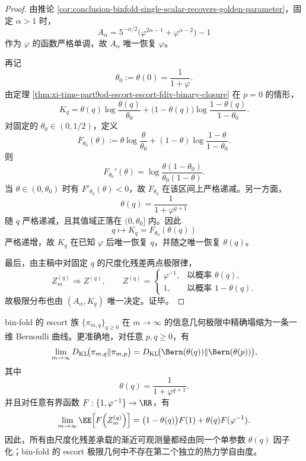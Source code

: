 \begin{proof}
由推论 \ref{cor:conclusion-binfold-single-scalar-recovers-golden-parameter}，固定 \(\alpha>1\) 时，
\[
A_\alpha
=
5^{-\alpha/2}\bigl(\varphi^{2\alpha-1}+\varphi^{\alpha-2}\bigr)-1
\]
作为 \(\varphi\) 的函数严格单调，故 \(A_\alpha\) 唯一恢复 \(\varphi\)。

再记
\[
\theta_0:=\theta(0)=\frac{1}{1+\varphi}.
\]
由定理 \ref{thm:xi-time-part9od-escort-escort-fdiv-binary-closure} 在 \(p=0\) 的情形，
\[
K_q
=
\theta(q)\log\frac{\theta(q)}{\theta_0}
+\bigl(1-\theta(q)\bigr)\log\frac{1-\theta(q)}{1-\theta_0}.
\]
对固定的 \(\theta_0\in(0,1/2)\)，定义
\[
F_{\theta_0}(\theta)
:=
\theta\log\frac{\theta}{\theta_0}
+(1-\theta)\log\frac{1-\theta}{1-\theta_0}.
\]
则
\[
F_{\theta_0}'(\theta)
=
\log\frac{\theta(1-\theta_0)}{\theta_0(1-\theta)}.
\]
当 \(\theta\in(0,\theta_0)\) 时有 \(F'_{\theta_0}(\theta)<0\)，故 \(F_{\theta_0}\) 在该区间上严格递减。另一方面，
\[
\theta(q)=\frac{1}{1+\varphi^{q+1}}
\]
随 \(q\) 严格递减，且其值域正落在 \((0,\theta_0]\) 内。因此
\[
q\longmapsto K_q=F_{\theta_0}(\theta(q))
\]
严格递增，故 \(K_q\) 在已知 \(\varphi\) 后唯一恢复 \(q\)，并随之唯一恢复 \(\theta(q)\)。

最后，由主稿中对固定 \(q\) 的尺度化残差两点极限律，
\[
Z_m^{(q)}\Rightarrow Z^{(q)},
\qquad
Z^{(q)}=
\begin{cases}
\varphi^{-1},& \text{以概率 }\theta(q),\\
1,& \text{以概率 }1-\theta(q).
\end{cases}
\]
故极限分布也由 \((A_\alpha,K_q)\) 唯一决定。证毕。
\end{proof}

\begin{corollary}\label{cor:conclusion-binfold-escort-limit-manifold-one-dimensional-kl-completion}
bin-fold 的 escort 族 \(\{\pi_{m,q}\}_{q\ge 0}\) 在 \(m\to\infty\) 的信息几何极限中精确塌缩为一条一维 Bernoulli 曲线。更准确地，对任意 \(p,q\ge 0\)，有
\[
\lim_{m\to\infty}D_{\mathrm{KL}}\!\bigl(\pi_{m,q}\Vert \pi_{m,p}\bigr)
=
D_{\mathrm{KL}}\!\bigl(\Bern(\theta(q))\Vert \Bern(\theta(p))\bigr),
\]
其中
\[
\theta(q)=\frac{1}{1+\varphi^{q+1}}.
\]
并且对任意有界函数 \(F:\{1,\varphi^{-1}\}\to \RR\)，有
\[
\lim_{m\to\infty}\EE\!\left[F\!\left(Z_m^{(q)}\right)\right]
=
\bigl(1-\theta(q)\bigr)F(1)+\theta(q)F(\varphi^{-1}).
\]
因此，所有由尺度化残差承载的渐近可观测量都经由同一个单参数 \(\theta(q)\) 因子化；bin-fold 的 escort 极限几何中不存在第二个独立的热力学自由度。
\end{corollary}

